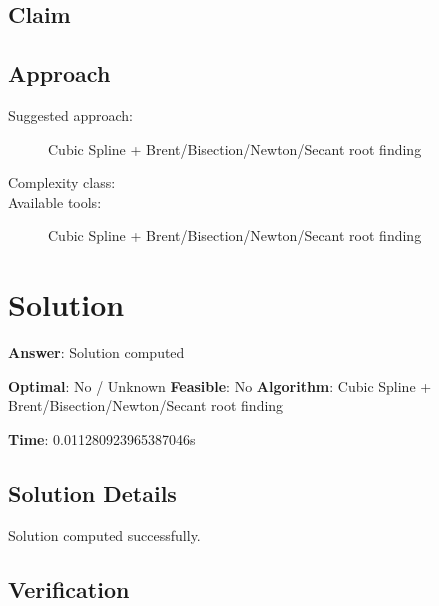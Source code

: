 \documentclass[11pt, a4paper]{article}
\begin{document}
\subsection{Claim}


\subsection{Approach}

\begin{description}
  \item[Suggested approach:] Cubic Spline + Brent/Bisection/Newton/Secant root finding
  \item[Complexity class:] 
  \item[Available tools:] Cubic Spline + Brent/Bisection/Newton/Secant root finding
\end{description}
\section{Solution}

\begin{polyaresult}

\textbf{Answer}: Solution computed


\textbf{Optimal}: No / Unknown \hfill
\textbf{Feasible}: No
\textbf{Algorithm}: Cubic Spline + Brent/Bisection/Newton/Secant root finding \quad $$

\textbf{Time}: 0.011280923965387046s


\end{polyaresult}

\subsection{Solution Details}

Solution computed successfully.

\subsection{Verification}
\end{document}
